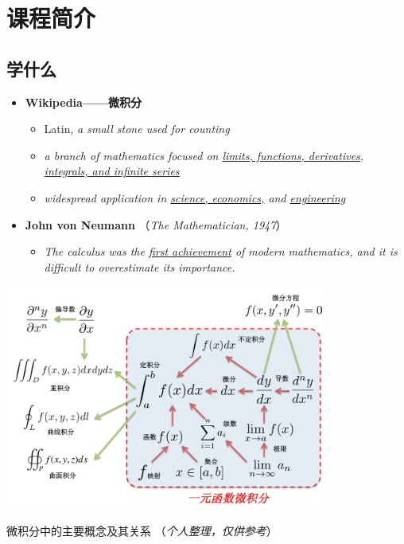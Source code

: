 \section{课程简介}

\subsection{学什么}

\begin{itemize}
	  \item {\bf Wikipedia——微积分} 
	\begin{itemize}
	  \item Latin, {\it a small stone used for counting}  
	  \item {\it a branch of mathematics focused on \underline{limits, functions,
	  	derivatives, integrals, and infinite series}} 
  	  \item {\it widespread application in \underline{science, economics,} 
  	  and \underline{engineering}} 
	\end{itemize}
	\item {\bf John von Neumann} （{\small\it The Mathematician, 1947}）
	\begin{itemize}
	  \item {\it The calculus was the \underline{first achievement} of modern
	  mathematics, and it is difficult to overestimate its importance.}
	\end{itemize} 
\end{itemize}



\begin{center}
	\includegraphics[width=0.8\textwidth]{./images/ch1/AM_architecture.jpg}
	
	{微积分中的主要概念及其关系\;
	（{\it 个人整理，仅供参考}）}
\end{center}



